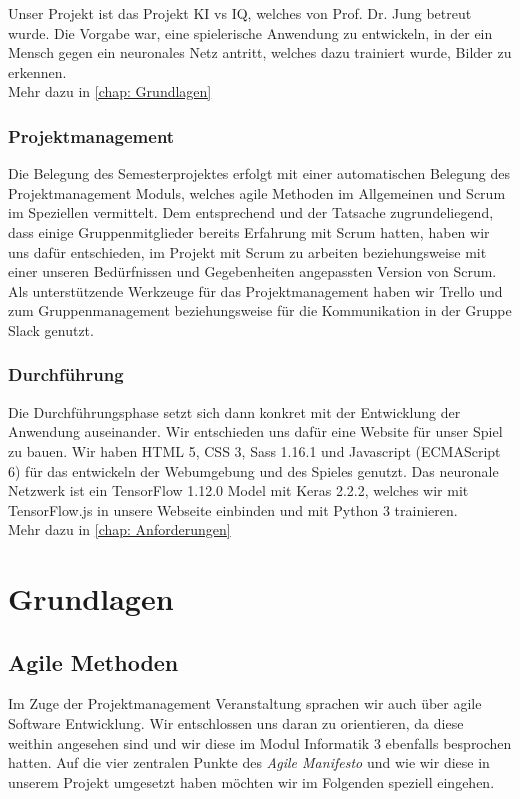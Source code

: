 \documentclass[11pt]{article}
\begin{document}
Unser Projekt ist das Projekt KI vs IQ, welches von Prof. Dr. Jung betreut wurde.
Die Vorgabe war, eine spielerische Anwendung zu entwickeln, in der ein Mensch gegen ein neuronales Netz antritt, welches dazu trainiert wurde, Bilder zu erkennen.\\
Mehr dazu in \autoref{chap: Grundlagen}
	
\subsubsection{  Projektmanagement }
\label{chap: Projektmanagement}
Die Belegung des Semesterprojektes erfolgt mit einer automatischen Belegung des Projektmanagement Moduls, welches agile Methoden im Allgemeinen und Scrum im Speziellen vermittelt. Dem entsprechend und der Tatsache zugrundeliegend, dass einige Gruppenmitglieder bereits Erfahrung mit Scrum hatten, haben wir uns dafür entschieden, im Projekt mit Scrum zu arbeiten beziehungsweise mit einer unseren Bedürfnissen und Gegebenheiten angepassten Version von Scrum.\\
Als unterstützende Werkzeuge für das Projektmanagement haben wir Trello und zum Gruppenmanagement beziehungsweise für die Kommunikation in der Gruppe Slack genutzt.

\subsubsection{ Durchführung }
\label{chap: durchfuhrung}
Die Durchführungsphase setzt sich dann konkret mit der Entwicklung der Anwendung auseinander. Wir entschieden uns dafür eine Website für unser Spiel zu bauen. Wir haben HTML 5, CSS 3, Sass 1.16.1 und Javascript (ECMAScript 6) für das entwickeln der Webumgebung und des Spieles genutzt. Das neuronale Netzwerk ist ein TensorFlow 1.12.0 Model mit Keras 2.2.2, welches wir mit TensorFlow.js in unsere Webseite einbinden und mit Python 3 trainieren.\\
Mehr dazu in \autoref{chap: Anforderungen}

\section{Grundlagen}
\label{chap: Grundlagen}
\subsection{Agile Methoden}
\label{chap: agileMethods}
Im Zuge der Projektmanagement Veranstaltung sprachen wir auch über agile Software Entwicklung. Wir entschlossen uns daran zu orientieren, da diese weithin angesehen sind und wir diese im Modul Informatik 3 ebenfalls besprochen hatten. Auf die vier zentralen Punkte des \textit{Agile Manifesto} \parencite{KentBeck2001} und wie wir diese in unserem Projekt umgesetzt haben möchten wir im Folgenden speziell eingehen.
\end{document}
